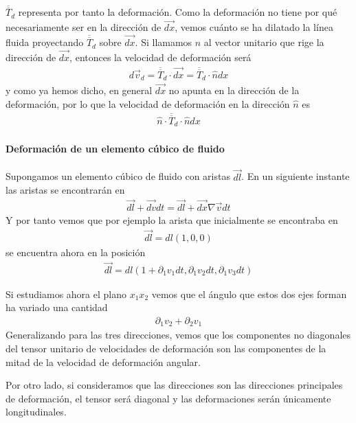 \documentclass[a4paper]{article}
\begin{document}
$\overline{\overline{T}}_d$ representa por tanto la deformación. Como
la deformación no tiene por qué necesariamente ser en la dirección
de $\vec{dx}$, vemos cuánto se ha dilatado la línea fluida 
proyectando $\overline{\overline{T}}_d$ sobre  $\vec{dx}$. Si llamamos
$\hat{n}$ al vector unitario que rige la dirección de $\vec{dx}$, 
entonces la velocidad de deformación será 
\begin{align*}
	d \vec{v}_d = \overline{\overline{T}}_d\cdot \vec{dx}   = \overline{\overline{T}}_d\cdot \hat{n}  dx 
\end{align*}
y como ya hemos dicho, en general $\vec{dx}$ no apunta en la dirección
de la deformación, por lo que la velocidad de deformación en la 
dirección $\hat{n}$ es 
\begin{align*}
	\hat{n}\cdot \overline{\overline{T}}_d\cdot \hat{n}  dx
\end{align*}
\newpage

\paragraph{Deformación de un elemento cúbico de fluido} 

Supongamos un elemento cúbico de fluido con aristas $\vec{dl}$.
En un siguiente instante las aristas se encontrarán en 
\begin{align*}
\vec{dl} + \vec{dv}dt =  \vec{dl} + \vec{dx}\nabla \vec{v}dt 
\end{align*}
Y por tanto vemos que por ejemplo la arista que inicialmente 
se encontraba en 
\begin{align*}
	\vec{dl} = dl (1, 0, 0)
\end{align*}
se encuentra ahora en la posición 
\begin{align*}
	\vec{dl} = dl(1 + \partial_1 v_1 dt, \partial_1 v_2dt,  \partial_1 v_3dt)
\end{align*}

Si estudiamos ahora el plano $x_1x_2$ vemos que el ángulo que estos
dos ejes forman ha variado una cantidad  
\begin{align*}
\partial_1 v_2 + \partial_2 v_1
\end{align*}
Generalizando para las tres direcciones, vemos que los componentes no
diagonales del tensor unitario de velocidades de deformación son 
las componentes de la mitad de la velocidad de deformación angular.

Por otro lado, si consideramos que las direcciones son las direcciones
principales de deformación, el tensor será diagonal y las deformaciones
serán únicamente longitudinales. 
\end{document}
